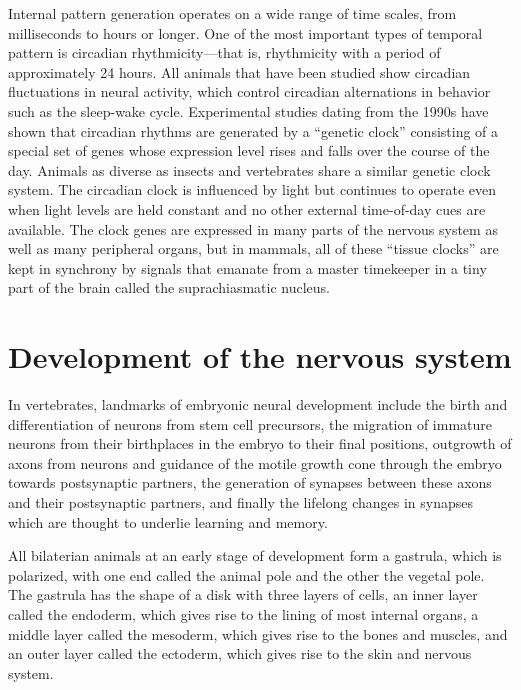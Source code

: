 Internal pattern generation operates on a wide range of time scales, from milliseconds to hours or longer. One of the most important types of temporal pattern is circadian rhythmicity---that is, rhythmicity with a period of approximately 24 hours. All animals that have been studied show circadian fluctuations in neural activity, which control circadian alternations in behavior such as the sleep-wake cycle. Experimental studies dating from the 1990s have shown that circadian rhythms are generated by a ``genetic clock'' consisting of a special set of genes whose expression level rises and falls over the course of the day. Animals as diverse as insects and vertebrates share a similar genetic clock system. The circadian clock is influenced by light but continues to operate even when light levels are held constant and no other external time-of-day cues are available. The clock genes are expressed in many parts of the nervous system as well as many peripheral organs, but in mammals, all of these ``tissue clocks'' are kept in synchrony by signals that emanate from a master timekeeper in a tiny part of the brain called the suprachiasmatic nucleus.

\hypertarget{development-of-the-nervous-system}{%
\section{Development of the nervous system}\label{development-of-the-nervous-system}}

In vertebrates, landmarks of embryonic neural development include the birth and differentiation of neurons from stem cell precursors, the migration of immature neurons from their birthplaces in the embryo to their final positions, outgrowth of axons from neurons and guidance of the motile growth cone through the embryo towards postsynaptic partners, the generation of synapses between these axons and their postsynaptic partners, and finally the lifelong changes in synapses which are thought to underlie learning and memory.

All bilaterian animals at an early stage of development form a gastrula, which is polarized, with one end called the animal pole and the other the vegetal pole. The gastrula has the shape of a disk with three layers of cells, an inner layer called the endoderm, which gives rise to the lining of most internal organs, a middle layer called the mesoderm, which gives rise to the bones and muscles, and an outer layer called the ectoderm, which gives rise to the skin and nervous system.

